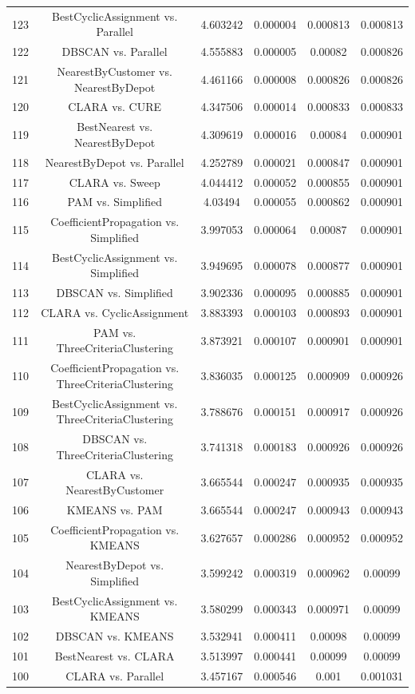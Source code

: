 \documentclass[a4paper,10pt]{article}
\begin{document}
\begin{landscape}
\begin{table}[!htp]
\begin{tabular}{cccccc}
123&BestCyclicAssignment vs. Parallel&4.603242&0.000004&0.000813&0.000813\\
122&DBSCAN vs. Parallel&4.555883&0.000005&0.00082&0.000826\\
121&NearestByCustomer vs. NearestByDepot&4.461166&0.000008&0.000826&0.000826\\
120&CLARA vs. CURE&4.347506&0.000014&0.000833&0.000833\\
119&BestNearest vs. NearestByDepot&4.309619&0.000016&0.00084&0.000901\\
118&NearestByDepot vs. Parallel&4.252789&0.000021&0.000847&0.000901\\
117&CLARA vs. Sweep&4.044412&0.000052&0.000855&0.000901\\
116&PAM vs. Simplified&4.03494&0.000055&0.000862&0.000901\\
115&CoefficientPropagation vs. Simplified&3.997053&0.000064&0.00087&0.000901\\
114&BestCyclicAssignment vs. Simplified&3.949695&0.000078&0.000877&0.000901\\
113&DBSCAN vs. Simplified&3.902336&0.000095&0.000885&0.000901\\
112&CLARA vs. CyclicAssignment&3.883393&0.000103&0.000893&0.000901\\
111&PAM vs. ThreeCriteriaClustering&3.873921&0.000107&0.000901&0.000901\\
110&CoefficientPropagation vs. ThreeCriteriaClustering&3.836035&0.000125&0.000909&0.000926\\
109&BestCyclicAssignment vs. ThreeCriteriaClustering&3.788676&0.000151&0.000917&0.000926\\
108&DBSCAN vs. ThreeCriteriaClustering&3.741318&0.000183&0.000926&0.000926\\
107&CLARA vs. NearestByCustomer&3.665544&0.000247&0.000935&0.000935\\
106&KMEANS vs. PAM&3.665544&0.000247&0.000943&0.000943\\
105&CoefficientPropagation vs. KMEANS&3.627657&0.000286&0.000952&0.000952\\
104&NearestByDepot vs. Simplified&3.599242&0.000319&0.000962&0.00099\\
103&BestCyclicAssignment vs. KMEANS&3.580299&0.000343&0.000971&0.00099\\
102&DBSCAN vs. KMEANS&3.532941&0.000411&0.00098&0.00099\\
101&BestNearest vs. CLARA&3.513997&0.000441&0.00099&0.00099\\
100&CLARA vs. Parallel&3.457167&0.000546&0.001&0.001031\\

\end{tabular}
\end{table}
\end{landscape}
\end{document}
